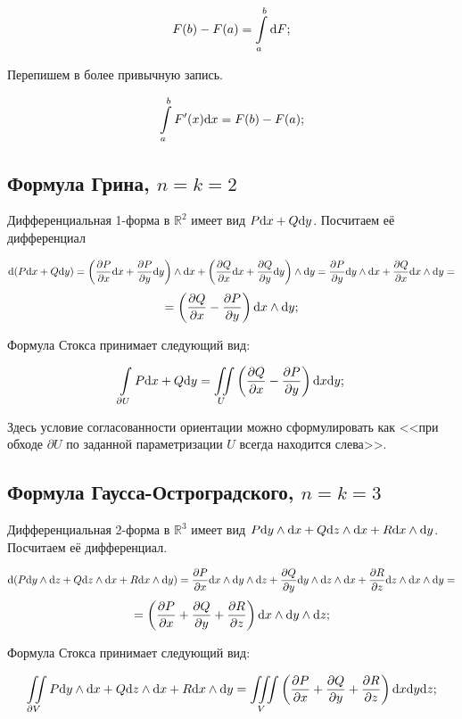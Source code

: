 \documentclass{article}
\begin{document}
	\[F(b) - F(a) = \int\limits_a^b \mathrm{d} F; \]
	
	Перепишем в более привычную запись.

	\[\int\limits_a^b F'(x) \mathrm{d} x = F(b) - F(a); \]

	\subsection*{Формула Грина, $n = k = 2$}

	Дифференциальная 1-форма в $\mathbb{R}^2$ имеет вид $P\mathrm{d} x + Q \mathrm{d} y$. Посчитаем её дифференциал

	\[\mathrm{d} (P \mathrm{d} x + Q \mathrm{d} y) = \left(\frac{\partial P}{\partial x}\mathrm{d} x + \frac{\partial P}{\partial y}\mathrm{d} y \right) \land \mathrm{d} x +\left(\frac{\partial Q}{\partial x}\mathrm{d} x + \frac{\partial Q}{\partial y}\mathrm{d} y \right) \land \mathrm{d} y = \frac{\partial P}{\partial y} \mathrm{d} y \land \mathrm{d} x + \frac{\partial Q}{\partial x} \mathrm{d} x \land \mathrm{d} y = \] \[ = \left(\frac{\partial Q}{\partial x} - \frac{\partial P}{\partial y}\right) \mathrm{d} x \land \mathrm{d} y;  \]

	Формула Стокса принимает следующий вид:

	\[\int\limits_{\partial U} P\mathrm{d} x + Q\mathrm{d} y = \iint\limits_{U} \left(\frac{\partial Q}{\partial x} - \frac{\partial P}{\partial y}\right)\mathrm{d} x \mathrm{d} y; \]

	Здесь условие согласованности ориентации можно сформулировать как <<при обходе $\partial U$ по заданной параметризации $U$ всегда находится слева>>.

	\subsection*{Формула Гаусса-Остроградского, $n = k = 3$}

	Дифференциальная 2-форма в $\mathbb{R}^3$ имеет вид $P\mathrm{d} y \land \mathrm{d} x + Q \mathrm{d} z \land \mathrm{d} x + R \mathrm{d} x \land \mathrm{d} y$. Посчитаем её дифференциал.

	\[\mathrm{d} (P\mathrm{d} y \land \mathrm{d} z + Q \mathrm{d} z \land \mathrm{d} x + R \mathrm{d} x \land \mathrm{d} y) = \frac{\partial P}{\partial x} \mathrm{d} x \land \mathrm{d} y \land \mathrm{d} z + \frac{\partial Q}{\partial y}\mathrm{d} y \land \mathrm{d} z \land \mathrm{d} x + \frac{\partial R}{\partial z} \mathrm{d} z \land \mathrm{d} x \land \mathrm{d} y  = \] \[ =\left( \frac{\partial P}{\partial x} + \frac{\partial Q}{\partial y} + \frac{\partial R}{\partial z} \right) \mathrm{d} x \land \mathrm{d} y \land \mathrm{d} z; \]

	Формула Стокса принимает следующий вид:

	\[\iint\limits_{\partial V} P\mathrm{d} y \land \mathrm{d} x + Q \mathrm{d} z \land \mathrm{d} x + R \mathrm{d} x \land \mathrm{d} y = \iiint\limits_{V}\left( \frac{\partial P}{\partial x} + \frac{\partial Q}{\partial y} + \frac{\partial R}{\partial z} \right) \mathrm{d} x\mathrm{d} y\mathrm{d} z; \]
\end{document}
